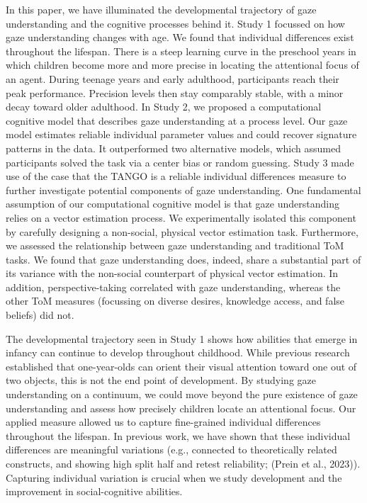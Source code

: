 \documentclass[
  man,mask,floatsintext]{apa6}
\begin{document}
In this paper, we have illuminated the developmental trajectory of gaze understanding and the cognitive processes behind it. Study 1 focussed on how gaze understanding changes with age. We found that individual differences exist throughout the lifespan. There is a steep learning curve in the preschool years in which children become more and more precise in locating the attentional focus of an agent. During teenage years and early adulthood, participants reach their peak performance. Precision levels then stay comparably stable, with a minor decay toward older adulthood. In Study 2, we proposed a computational cognitive model that describes gaze understanding at a process level. Our gaze model estimates reliable individual parameter values and could recover signature patterns in the data. It outperformed two alternative models, which assumed participants solved the task via a center bias or random guessing. Study 3 made use of the case that the TANGO is a reliable individual differences measure to further investigate potential components of gaze understanding. One fundamental assumption of our computational cognitive model is that gaze understanding relies on a vector estimation process. We experimentally isolated this component by carefully designing a non-social, physical vector estimation task. Furthermore, we assessed the relationship between gaze understanding and traditional ToM tasks. We found that gaze understanding does, indeed, share a substantial part of its variance with the non-social counterpart of physical vector estimation. In addition, perspective-taking correlated with gaze understanding, whereas the other ToM measures (focussing on diverse desires, knowledge access, and false beliefs) did not.

The developmental trajectory seen in Study 1 shows how abilities that emerge in infancy can continue to develop throughout childhood. While previous research established that one-year-olds can orient their visual attention toward one out of two objects, this is not the end point of development. By studying gaze understanding on a continuum, we could move beyond the pure existence of gaze understanding and assess how precisely children locate an attentional focus. Our applied measure allowed us to capture fine-grained individual differences throughout the lifespan. In previous work, we have shown that these individual differences are meaningful variations (e.g., connected to theoretically related constructs, and showing high split half and retest reliability; (Prein et al., 2023)). Capturing individual variation is crucial when we study development and the improvement in social-cognitive abilities.
\end{document}
